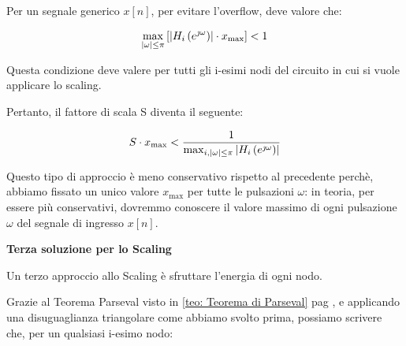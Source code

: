 Per un segnale generico $x \left[ n\right]$, per evitare l'overflow, deve valore che: 

{
    \Large 
    \begin{equation}
        \max_{\abs{\omega} \leq \pi}
        \left[
            \abs{H_{i} \left(e^{\jmath \omega}\right)} 
            \cdot 
            x_{\text{max}}
        \right]
        < 
        1 
    \end{equation}
}

Questa condizione deve valere per tutti gli i-esimi nodi  del circuito in cui si vuole applicare lo scaling. \newline 

Pertanto, il fattore di scala S diventa il seguente: 

{
    \Large 
    \begin{equation}
        S \cdot x_{\text{max}}
        < 
        \dfrac{1}{
            \max_{i, \abs{\omega} \leq \pi}
            \abs{H_{i} \left(e^{\jmath \omega}\right)}
        }
    \end{equation}
}

Questo tipo di approccio è meno conservativo rispetto al precedente perchè, abbiamo fissato un unico valore $x_{\text{max}}$ per tutte le pulsazioni $\omega$:  
in teoria, per essere più conservativi, dovremmo conoscere il valore massimo di ogni pulsazione $\omega$ del segnale di ingresso $x \left[ n\right]$. \newline 

\textbf{Terza soluzione per lo Scaling} \newline 

Un terzo approccio allo Scaling è sfruttare l'energia di ogni nodo. \newline 

Grazie al Teorema Parseval visto in \ref{teo: Teorema di Parseval}  pag \pageref{teo: Teorema di Parseval}, e applicando una disuguaglianza triangolare come abbiamo svolto prima, 
possiamo scrivere che, per un qualsiasi i-esimo nodo:

